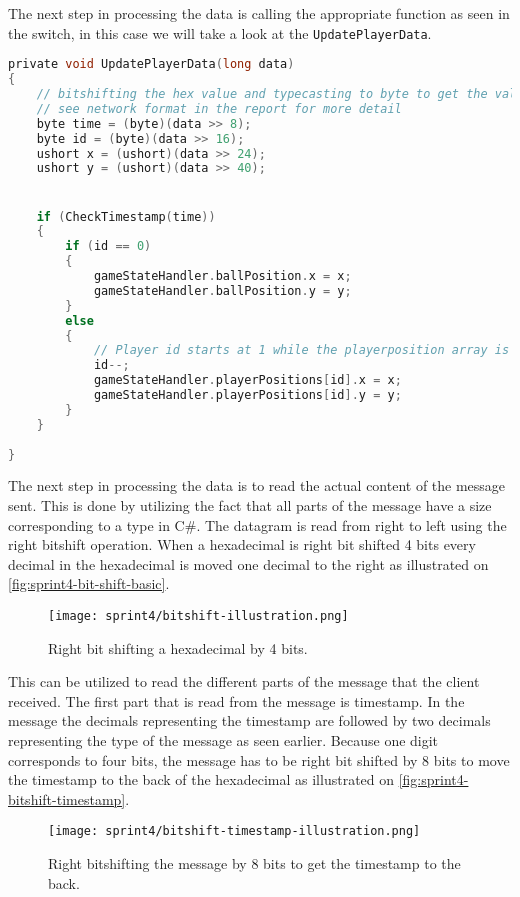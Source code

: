 \noindent 
The next step in processing the data is calling the appropriate function as seen in the switch, in this case we will take a look at the \texttt{UpdatePlayerData}.

\begin{lstlisting}[caption={Updating player data in UDP client}, captionpos=b,language=C,label={lst:updateplayerdata}]
private void UpdatePlayerData(long data)
{
    // bitshifting the hex value and typecasting to byte to get the values.
    // see network format in the report for more detail
    byte time = (byte)(data >> 8);
    byte id = (byte)(data >> 16);
    ushort x = (ushort)(data >> 24);
    ushort y = (ushort)(data >> 40);


    if (CheckTimestamp(time))
    {
        if (id == 0)
        {
            gameStateHandler.ballPosition.x = x;
            gameStateHandler.ballPosition.y = y;
        }
        else
        {
            // Player id starts at 1 while the playerposition array is 0 indexed. Decrementing id so that they line up.
            id--;
            gameStateHandler.playerPositions[id].x = x;
            gameStateHandler.playerPositions[id].y = y;
        }
    }
    
}
\end{lstlisting}
\noindent 
The next step in processing the data is to read the actual content of the message sent.
This is done by utilizing the fact that all parts of the message have a size corresponding to a type in C\#.
The datagram is read from right to left using the right bitshift operation.
When a hexadecimal is right bit shifted 4 bits every decimal in the hexadecimal is moved one decimal to the right as illustrated on \autoref{fig:sprint4-bit-shift-basic}.
\begin{figure}[H]
    \centering
    \texttt{[image: sprint4/bitshift-illustration.png]}
    \caption{Right bit shifting a hexadecimal by 4 bits.}
    \label{fig:sprint4-bit-shift-basic}
\end{figure}
This can be utilized to read the different parts of the message that the client received.
The first part that is read from the message is timestamp.
In the message the decimals representing the timestamp are followed by two decimals representing the type of the message as seen earlier.
Because one digit corresponds to four bits, the message has to be right bit shifted by 8 bits to move the timestamp to the back of the hexadecimal as illustrated on \autoref{fig:sprint4-bitshift-timestamp}.
\begin{figure}[H]
    \centering
    \texttt{[image: sprint4/bitshift-timestamp-illustration.png]}
    \caption{Right bitshifting the message by 8 bits to get the timestamp to the back.}
    \label{fig:sprint4-bitshift-timestamp}
\end{figure}

